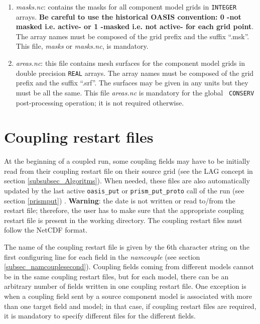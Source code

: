 \begin{enumerate}
\item {\em masks.nc}: contains the masks for all component model grids
  in {\tt INTEGER} arrays. {\bf Be careful to use the historical
    OASIS convention: 0 -not masked i.e.  active- or 1 -masked
    i.e. not active- for each grid point}. The array names must be
  composed of the grid prefix and the suffix ``.msk''. This file, {\em
    masks} or {\em masks.nc}, is mandatory.

\item {\em areas.nc}: this file contains mesh surfaces for the
  component model grids in double precision {\tt REAL} arrays. The
  array names must be composed of the grid prefix and the suffix
  ``.srf''.  The surfaces may be given in any units but they must be
  all the same. This file {\em areas.nc} is mandatory for the global {\tt
    CONSERV} post-processing operation;
  it is not required otherwise.

\end{enumerate}

\section{Coupling restart files}
\label{subsec_restartdata}

At the beginning of a coupled run, some coupling fields may have to be
initially read from their coupling restart file on their source grid
(see the LAG concept in section \ref{subsubsec_Algoritms}). When
needed, these files are also automatically updated by the last active
{\tt oasis\_put} or {\tt prism\_put\_proto} call of the run (see
section \ref{prismput}) .
{\bf Warning}: the date is not written or read to/from the restart
file; therefore, the user has to make sure that the appropriate
coupling restart file is present in the working directory. The
coupling restart files must follow the NetCDF format.


The name of the coupling restart file is given by the 6th character
string on the first configuring line for each field in the {\it
  namcouple} (see section \ref{subsec_namcouplesecond}). Coupling
fields coming from different models cannot be in the same coupling
restart files, but for each model, there can be an arbitrary number of
fields written in one coupling restart file. One exception is when a coupling field sent by a source component model is associated with more than one target field and model; in that case, if coupling restart files are required, it is mandatory to specify different files for the different fields. 

